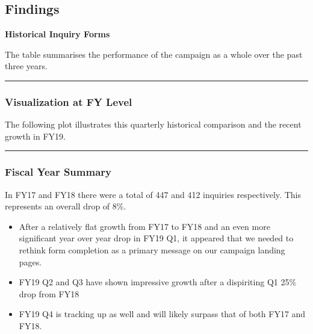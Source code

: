\documentclass[]{tufte-handout}
\begin{document}
\hypertarget{findings}{%
\subsection{Findings}\label{findings}}

\textbf{Historical Inquiry Forms}

The table summarises the performance of the campaign as a whole over the
past three years.

\begin{center}\rule{0.5\linewidth}{\linethickness}\end{center}

\hypertarget{visualization-at-fy-level}{%
\subsubsection{Visualization at FY
Level}\label{visualization-at-fy-level}}

The following plot illustrates this quarterly historical comparison and
the recent growth in FY19.

\begin{center}\rule{0.5\linewidth}{\linethickness}\end{center}

\hypertarget{fiscal-year-summary}{%
\subsubsection{Fiscal Year Summary}\label{fiscal-year-summary}}

\begin{marginfigure}
In FY17 and FY18 there were a total of 447 and 412 inquiries
respectively. This represents an overall drop of 8\%.
\end{marginfigure}


\begin{itemize}
\item
  After a relatively flat growth from FY17 to FY18 and an even more
  significant year over year drop in FY19 Q1, it appeared that we needed
  to rethink form completion as a primary message on our campaign
  landing pages.
\item
  FY19 Q2 and Q3 have shown impressive growth after a dispiriting Q1
  25\% drop from FY18
\item
  FY19 Q4 is tracking up as well and will likely surpass that of both
  FY17 and FY18.
\end{itemize}
\end{document}

